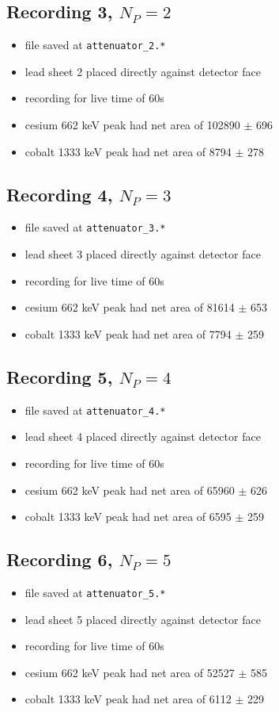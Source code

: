 \documentclass[a4paper]{article}
\begin{document}
\subsection{Recording 3, $N_{P}=2$}
\begin{itemize}
    \item file saved at \verb|attenuator_2.*|
    \item lead sheet 2 placed directly against detector face
    \item recording for live time of 60s
    \item cesium 662 keV peak had net area of 102890 $\pm$ 696
    \item cobalt 1333 keV peak had net area of 8794 $\pm$ 278
\end{itemize}

\subsection{Recording 4, $N_{P}=3$}
\begin{itemize}
    \item file saved at \verb|attenuator_3.*|
    \item lead sheet 3 placed directly against detector face
    \item recording for live time of 60s
    \item cesium 662 keV peak had net area of 81614 $\pm$ 653
    \item cobalt 1333 keV peak had net area of 7794 $\pm$ 259
\end{itemize}

\subsection{Recording 5, $N_{P}=4$}
\begin{itemize}
    \item file saved at \verb|attenuator_4.*|
    \item lead sheet 4 placed directly against detector face
    \item recording for live time of 60s
    \item cesium 662 keV peak had net area of 65960 $\pm$ 626
    \item cobalt 1333 keV peak had net area of 6595 $\pm$ 259
\end{itemize}

\subsection{Recording 6, $N_{P}=5$}
\begin{itemize}
    \item file saved at \verb|attenuator_5.*|
    \item lead sheet 5 placed directly against detector face
    \item recording for live time of 60s
    \item cesium 662 keV peak had net area of 52527 $\pm$ 585
    \item cobalt 1333 keV peak had net area of 6112 $\pm$ 229
\end{itemize}
\end{document}
